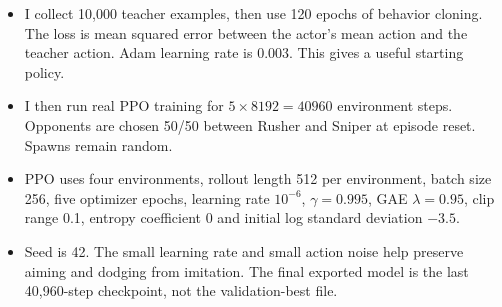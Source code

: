 \documentclass[a4paper]{article}
\begin{document}
\begin{answer}
\begin{itemize}
\item I collect 10,000 teacher examples, then use 120 epochs of behavior cloning. The loss is mean squared error between the actor's mean action and the teacher action. Adam learning rate is 0.003. This gives a useful starting policy.
\item I then run real PPO training for $5\times8192=40960$ environment steps. Opponents are chosen 50/50 between Rusher and Sniper at episode reset. Spawns remain random.
\item PPO uses four environments, rollout length 512 per environment, batch size 256, five optimizer epochs, learning rate $10^{-6}$, $\gamma=0.995$, GAE $\lambda=0.95$, clip range 0.1, entropy coefficient 0 and initial log standard deviation $-3.5$.
\item Seed is 42. The small learning rate and small action noise help preserve aiming and dodging from imitation. The final exported model is the last 40,960-step checkpoint, not the validation-best file.
\end{itemize}
\end{answer}
\newpage
\end{document}
